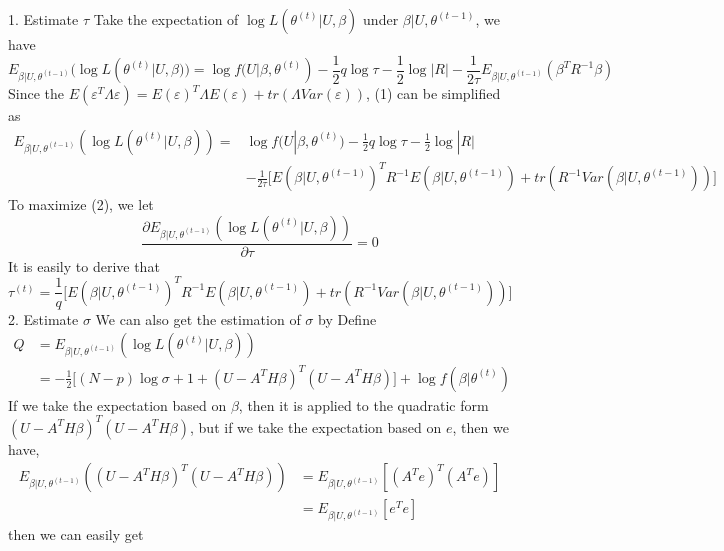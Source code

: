 \documentclass[12pt]{article}
\begin{document}
    1. Estimate $\tau$
    Take the expectation of $\log L(\theta^{(t)}|U,\beta)$ under $\beta|U,\theta^{(t-1)}$, we have
    \begin{equation*}
        E_{\beta|U,\theta^{(t-1)}}(\log L(\theta^{(t)}|U,\beta))=\log f(U|\beta,\theta^{(t)})-\frac{1}{2} q\log\tau-\frac{1}{2}\log|R|-\frac{1}{2\tau}E_{\beta|U,\theta^{(t-1)}}(\beta^TR^{-1}\beta)
    \end{equation*}
     Since the $E(\varepsilon^T\Lambda\varepsilon)=E(\varepsilon)^T\Lambda E(\varepsilon)+tr(\Lambda Var(\varepsilon))$, (1) can be simplified as
    \begin{equation*}
    \begin{split}
        E_{\beta|U,\theta^{(t-1)}}(\log L(\theta^{(t)}|U,\beta))=&\log f(U|\beta,\theta^{(t)})-\frac{1}{2} q\log\tau-\frac{1}{2}\log|R|\\
        &-\frac{1}{2\tau}\Big[E(\beta|U,\theta^{(t-1)})^TR^{-1} E(\beta|U,\theta^{(t-1)})+tr(R^{-1} Var(\beta|U,\theta^{(t-1)}))\Big]
    \end{split}
    \end{equation*}
    To maximize (2), we let
    \begin{equation*}
    \frac{\partial E_{\beta|U,\theta^{(t-1)}}(\log L(\theta^{(t)}|U,\beta))}{\partial \tau}=0
    \end{equation*}
    It is easily to derive that
    \begin{equation}
        \tau^{(t)}=\frac{1}{q}\Big[E(\beta|U,\theta^{(t-1)})^TR^{-1} E(\beta|U,\theta^{(t-1)})+tr(R^{-1} Var(\beta|U,\theta^{(t-1)}))\Big]
    \end{equation}
    2. Estimate $\sigma$
    We can also get the estimation of $\sigma$ by
    Define
    \begin{align*}
        Q&=E_{\beta|U,\theta^{(t-1)}}(\log L(\theta^{(t)}|U,\beta))\\
        &=-\frac{1}{2}\Big[(N-p)\log\sigma+1+(U-A^TH\beta)^T(U-A^TH\beta)\Big]+\log f(\beta|\theta^{(t)})
    \end{align*}
    If we take the expectation based on $\beta$, then it is applied to the quadratic form $(U-A^TH\beta)^T(U-A^TH\beta)$, but if we  take the expectation based on $e$, then we have,
    \begin{align*}
        E_{\beta|U,\theta^{(t-1)}}((U-A^TH\beta)^T(U-A^TH\beta))&= E_{\beta|U,\theta^{(t-1)}}[(A^Te)^T(A^Te)]\\
        &= E_{\beta|U,\theta^{(t-1)}}[e^Te]
    \end{align*}
    then we can easily get
\end{document}
